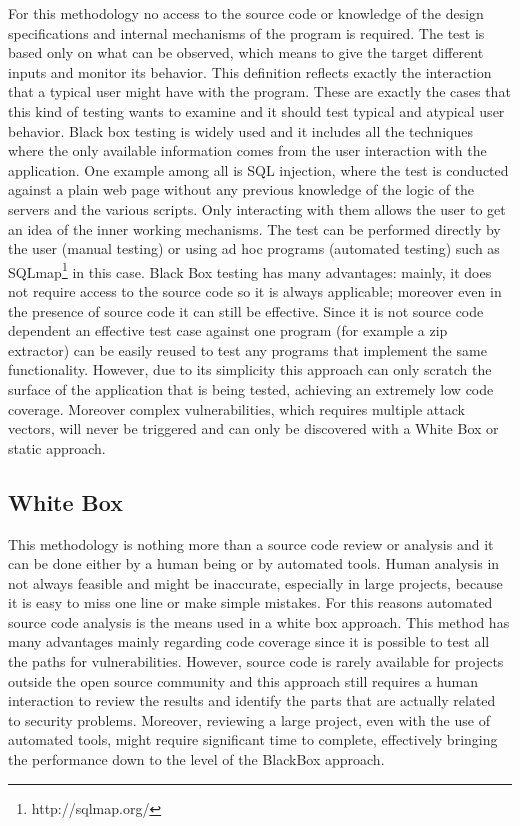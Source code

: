 \documentclass[../main.tex]{subfiles}
\begin{document}
For this methodology no access to the source code or knowledge of the design
specifications and internal mechanisms of the program is required. The test is
based only on what can be observed, which means to give the target different
inputs and monitor its behavior. This definition reflects exactly the
interaction that a typical user might have with the program. These are exactly
the cases that this kind of testing wants to examine and it should test typical
and atypical user behavior. Black box testing is widely used and it includes all
the techniques where the only available information comes from the user
interaction with the application. One example among all is SQL injection, where
the test is conducted against a plain web page without any previous knowledge of
the logic of the servers and the various scripts. Only interacting with them
allows the user to get an idea of the inner working mechanisms. The test can be
performed directly by the user (manual testing) or using ad hoc programs
(automated testing) such as SQLmap\footnote{http://sqlmap.org/} in this case.
Black Box testing has many advantages: mainly, it does not require access to the
source code so it is always applicable; moreover even in the presence of source
code it can still be effective. Since it is not source code dependent an
effective test case against one program (for example a zip extractor) can be
easily reused to test any programs that implement the same functionality.
However, due to its simplicity this approach can only scratch the surface of the
application that is being tested, achieving an extremely low code coverage. Moreover complex vulnerabilities, which requires multiple attack vectors, will never be triggered and can only be discovered with a White Box or static approach.

\subsection{White Box}

This methodology is nothing more than a source code review or analysis and it
can be done either by a human being or by automated tools. Human analysis in not
always feasible and might be inaccurate, especially in large projects, because
it is easy to miss one line or make simple mistakes. For this reasons automated
source code analysis is the means used in a white box approach. This method
has many advantages mainly regarding code coverage since it is possible to test
all the paths for vulnerabilities. However, source code is rarely available for
projects outside the open source community and this approach still requires a
human interaction to review the results and identify the parts that are actually
related to security problems. Moreover, reviewing a large project, even with the
use of automated tools, might require significant time to complete, effectively
bringing the performance down to the level of the BlackBox approach.
\end{document}

